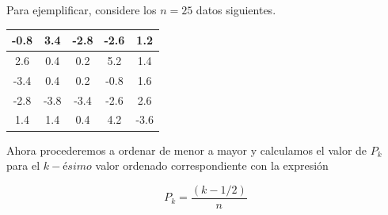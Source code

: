\documentclass[
  10pt,
  ignorenonframetext,
]{beamer}
\begin{document}
\begin{frame}{}
\protect\hypertarget{section-39}{}
\begin{minipage}{\textwidth}

\begin{multicols}{2}

Para ejemplificar, considere los $n=25$ datos siguientes.

\begin{table}
\centering\begingroup\fontsize{9}{11}\selectfont

\begin{tabular}{c|c|c|c|c}
\hline
-0.8 & 3.4 & -2.8 & -2.6 & 1.2\\
\hline
2.6 & 0.4 & 0.2 & 5.2 & 1.4\\
\hline
-3.4 & 0.4 & 0.2 & -0.8 & 1.6\\
\hline
-2.8 & -3.8 & -3.4 & -2.6 & 2.6\\
\hline
1.4 & 1.4 & 0.4 & 4.2 & -3.6\\
\hline
\end{tabular}
\endgroup{}
\end{table}

Ahora procederemos a ordenar de menor a mayor y calculamos el valor de $P_k$ para el $k-ésimo$ valor ordenado correspondiente con la expresión

$$P_k = \frac{(k - 1/2)}{n}$$



\begin{table}
\centering\begingroup\fontsize{7}{9}\selectfont


\end{table}
\end{multicols}
\end{minipage}
\end{frame}
\end{document}
